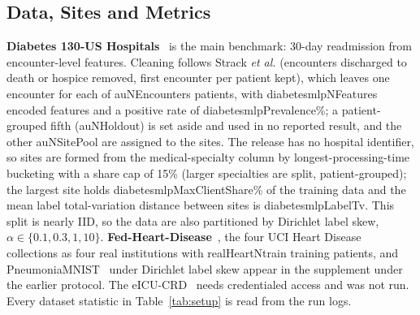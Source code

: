 \subsection{Data, Sites and Metrics}
\textbf{Diabetes 130-US Hospitals}~\cite{strack2014} is the main benchmark: 30-day readmission from encounter-level features. Cleaning follows Strack \emph{et al.} (encounters discharged to death or hospice removed, first encounter per patient kept), which leaves one encounter for each of \num{auNEncounters} patients, with \num{diabetesmlpNFeatures} encoded features and a positive rate of \num{diabetesmlpPrevalence}\%; a patient-grouped fifth (\num{auNHoldout}) is set aside and used in no reported result, and the other \num{auNSitePool} are assigned to the sites. The release has no hospital identifier, so sites are formed from the medical-specialty column by longest-processing-time bucketing with a share cap of 15\% (larger specialties are split, patient-grouped); the largest site holds \num{diabetesmlpMaxClientShare}\% of the training data and the mean label total-variation distance between sites is \num{diabetesmlpLabelTv}. This split is nearly IID, so the data are also partitioned by Dirichlet label skew, $\alpha\in\{0.1,0.3,1,10\}$. \textbf{Fed-Heart-Disease}~\cite{detrano1989,duterrail2022flamby}, the four UCI Heart Disease collections as four real institutions with \num{realHeartNtrain} training patients, and PneumoniaMNIST~\cite{yang2023medmnist} under Dirichlet label skew appear in the supplement under the earlier protocol. The eICU-CRD~\cite{pollard2018} needs credentialed access and was not run. Every dataset statistic in Table~\ref{tab:setup} is read from the run logs.

